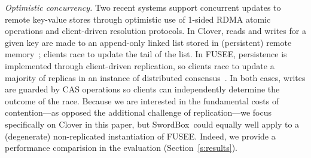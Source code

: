 \documentclass[12pt]{ucsddissertation}
\newcommand{\sword}{SwordBox}
\begin{document}






\emph{Optimistic concurrency.}  Two recent systems support concurrent
updates to remote key-value stores through optimistic use of
1-sided RDMA atomic operations and client-driven resolution protocols. 
In Clover, reads and writes for a given key are made to an append-only
linked list stored in (persistent) remote memory~\cite{clover};
clients race to update the tail of the list.  In FUSEE, persistence is
implemented through client-driven replication, so clients race to
update a majority of replicas in an instance of distributed
consensus~\cite{fusee}.  In both cases, writes are guarded by CAS
operations so clients can independently determine the outcome of the
race.  Because we are interested in the fundamental costs of
  contention---as opposed the additional challenge of replication---we focus specifically on Clover in this paper, but \sword\ could equally well apply to a (degenerate) non-replicated instantiation of FUSEE.  Indeed, we provide a performance comparision in the evaluation (Section~\ref{s:results}).
\end{document}
